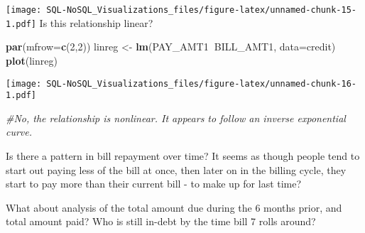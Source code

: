 \documentclass[]{article}
\newenvironment{Shaded}{\begin{snugshade}}{\end{snugshade}}
\newcommand{\KeywordTok}[1]{\textcolor[rgb]{0.13,0.29,0.53}{\textbf{#1}}}
\newcommand{\DataTypeTok}[1]{\textcolor[rgb]{0.13,0.29,0.53}{#1}}
\newcommand{\DecValTok}[1]{\textcolor[rgb]{0.00,0.00,0.81}{#1}}
\newcommand{\StringTok}[1]{\textcolor[rgb]{0.31,0.60,0.02}{#1}}
\newcommand{\CommentTok}[1]{\textcolor[rgb]{0.56,0.35,0.01}{\textit{#1}}}
\newcommand{\OperatorTok}[1]{\textcolor[rgb]{0.81,0.36,0.00}{\textbf{#1}}}
\newcommand{\NormalTok}[1]{#1}
\begin{document}
\texttt{[image: SQL-NoSQL\_Visualizations\_files/figure-latex/unnamed-chunk-15-1.pdf]}
Is this relationship linear?

\begin{Shaded}
\begin{Highlighting}[]
\KeywordTok{par}\NormalTok{(}\DataTypeTok{mfrow=}\KeywordTok{c}\NormalTok{(}\DecValTok{2}\NormalTok{,}\DecValTok{2}\NormalTok{))}
\NormalTok{linreg <-}\StringTok{ }\KeywordTok{lm}\NormalTok{(PAY_AMT1}\OperatorTok{~}\NormalTok{BILL_AMT1, }\DataTypeTok{data=}\NormalTok{credit)}
\KeywordTok{plot}\NormalTok{(linreg)}
\end{Highlighting}
\end{Shaded}

\texttt{[image: SQL-NoSQL\_Visualizations\_files/figure-latex/unnamed-chunk-16-1.pdf]}

\begin{Shaded}
\begin{Highlighting}[]
\CommentTok{#No, the relationship is nonlinear. It appears to follow an inverse exponential curve.}
\end{Highlighting}
\end{Shaded}

Is there a pattern in bill repayment over time? It seems as though
people tend to start out paying less of the bill at once, then later on
in the billing cycle, they start to pay more than their current bill -
to make up for last time?

What about analysis of the total amount due during the 6 months prior,
and total amount paid? Who is still in-debt by the time bill 7 rolls
around?

\begin{Shaded}
\end{Shaded}
\end{document}
